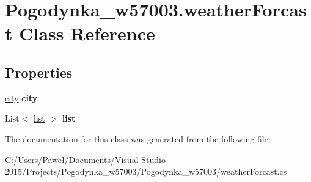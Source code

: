 \hypertarget{class_pogodynka__w57003_1_1weather_forcast}{}\section{Pogodynka\+\_\+w57003.\+weather\+Forcast Class Reference}
\label{class_pogodynka__w57003_1_1weather_forcast}
\subsection*{Properties}
\begin{DoxyCompactItemize}
\item 
\mbox{\label{class_pogodynka__w57003_1_1weather_forcast_ab3948b92f20a1509d2053e46ee326b2c}} 
\mbox{\hyperlink{class_pogodynka__w57003_1_1city}{city}} {\bfseries city}
\item 
\mbox{\label{class_pogodynka__w57003_1_1weather_forcast_a50b551a6ea78490be372e8b8511e1713}} 
List$<$ \mbox{\hyperlink{class_pogodynka__w57003_1_1list}{list}} $>$ {\bfseries list}
\end{DoxyCompactItemize}


The documentation for this class was generated from the following file\+:\begin{DoxyCompactItemize}
\item 
C\+:/\+Users/\+Paweł/\+Documents/\+Visual Studio 2015/\+Projects/\+Pogodynka\+\_\+w57003/\+Pogodynka\+\_\+w57003/weather\+Forcast.\+cs\end{DoxyCompactItemize}
